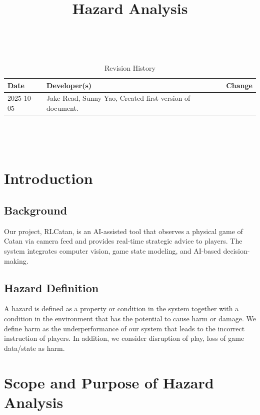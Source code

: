 \documentclass{article}
\title{Hazard Analysis\\\progname}
\author{\authname}
\date{}
\begin{document}
\maketitle
\thispagestyle{empty}

~\newpage


\begin{table}[hp]
\caption{Revision History} \label{TblRevisionHistory}
\begin{tabularx}{\textwidth}{llX}
\toprule
\textbf{Date} & \textbf{Developer(s)} & \textbf{Change}\\
\midrule
2025-10-05 & Jake Read, Sunny Yao, Created first version of document.\\

\bottomrule
\end{tabularx}
\end{table}

~\newpage

\tableofcontents
\listoftables
\listoffigures

~\newpage



\section{Introduction}\label{sec:introduction}


\subsection{Background}\label{subsec:background}
Our project, RLCatan, is an AI-assisted tool that observes a physical game of Catan via camera feed and provides real-time strategic advice to players.
The system integrates computer vision, game state modeling, and AI-based decision-making.

\subsection{Hazard Definition}\label{subsec:hazard-definition}
A hazard is defined as a property or condition in the system together
with a condition in the environment that has the potential to cause harm or
damage. We define harm as the underperformance of our system
that leads to the incorrect instruction of players. In addition, we consider
disruption of play, loss of game data/state as harm.


\section{Scope and Purpose of Hazard Analysis}\label{sec:scope-and-purpose-of-hazard-analysis}
\end{document}
